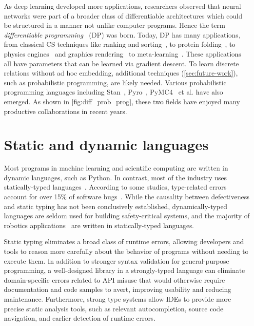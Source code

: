As deep learning developed more applications, researchers observed that neural networks were part of a broader class of differentiable architectures which could be structured in a manner not unlike computer programs. Hence the term \textit{differentiable programming}~\citep{olah2015neural, baydin2016differentiable, plotkin2018some} (DP) was born. Today, DP has many applications, from classical CS techniques like ranking and sorting~\citep{cuturi2019differentiable, blondel2020fast}, to protein folding~\citep{alquraishi2018end}, to physics engines~\citep{hu2019difftaichi, de2018end, degrave2016differentiable} and graphics rendering~\citep{loper2014opendr} to meta-learning~\citep{liu2018darts, chandra2019gradient}. These applications all have parameters that can be learned via gradient descent. To learn discrete relations without ad hoc embedding, additional techniques (\autoref{sec:future-work}), such as probabilistic programming, are likely needed. Various probabilistic programming languages including Stan~\citep{carpenter2017stan}, Pyro~\citep{bingham2019pyro}, PyMC4~\citep{kochurov2019pymc4} et al. have also emerged. As shown in \autoref{fig:diff_prob_prog}, these two fields have enjoyed many productive collaborations in recent years.

\section{Static and dynamic languages}

Most programs in machine learning and scientific computing are written in dynamic languages, such as Python. In contrast, most of the industry uses statically-typed languages~\citep{github}. According to some studies, type-related errors account for over 15\% of software bugs~\citep{gao2017type}. While the causality between defectiveness and static typing has not been conclusively established, dynamically-typed languages are seldom used for building safety-critical systems, and the majority of robotics applications~\citep{guenther2018serious} are written in statically-typed languages.

Static typing eliminates a broad class of runtime errors, allowing developers and tools to reason more carefully about the behavior of programs without needing to execute them. In addition to stronger syntax validation for general-purpose programming, a well-designed library in a strongly-typed language can eliminate domain-specific errors related to API misuse that would otherwise require documentation and code samples to avert, improving usability and reducing maintenance. Furthermore, strong type systems allow IDEs to provide more precise static analysis tools, such as relevant autocompletion, source code navigation, and earlier detection of runtime errors.

